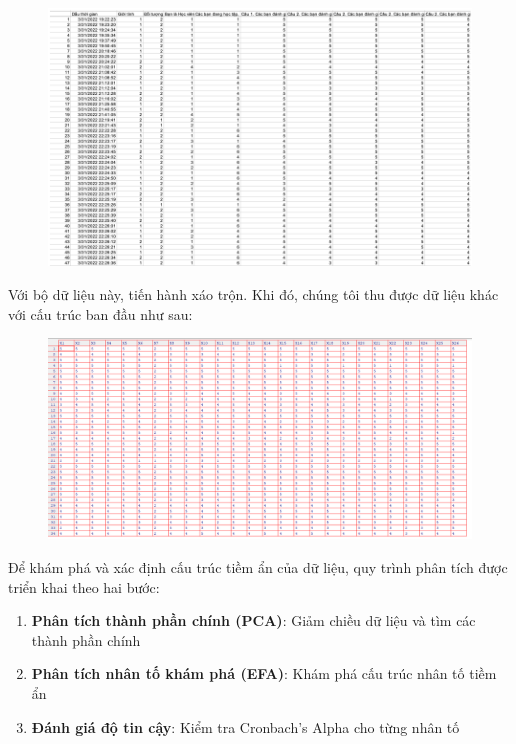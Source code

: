 \begin{figure}[h!]
    \centering
    \includegraphics[width=\textwidth]{../../assets/images/SP19.png}
\end{figure}

Với bộ dữ liệu này, tiến hành xáo trộn. Khi đó, chúng tôi thu được dữ liệu khác với cấu trúc ban đầu như sau:

\begin{figure}[h!]
    \centering
    \includegraphics[width=\textwidth]{../../assets/images/data2b.png}
\end{figure}

Để khám phá và xác định cấu trúc tiềm ẩn của dữ liệu, quy trình phân tích được triển khai theo hai bước:

\begin{enumerate}
    \item \textbf{Phân tích thành phần chính (PCA)}: Giảm chiều dữ liệu và tìm các thành phần chính
    \item \textbf{Phân tích nhân tố khám phá (EFA)}: Khám phá cấu trúc nhân tố tiềm ẩn
    \item \textbf{Đánh giá độ tin cậy}: Kiểm tra Cronbach's Alpha cho từng nhân tố
\end{enumerate}


